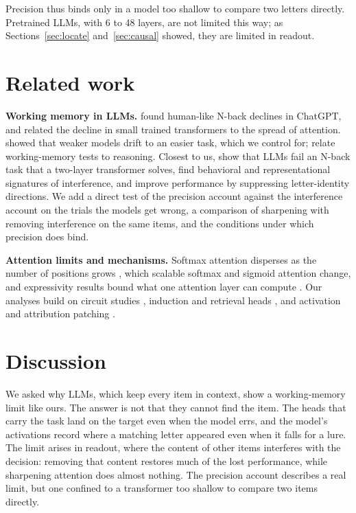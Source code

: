 \documentclass{article}
\begin{document}
Precision thus binds only in a model too shallow to compare two letters directly. Pretrained LLMs, with 6 to 48 layers, are not limited this way; as Sections~\ref{sec:locate} and~\ref{sec:causal} showed, they are limited in readout.



\section{Related work}
\label{sec:related}

\textbf{Working memory in LLMs.} \citet{gong2024chatgpt} found human-like N-back declines in ChatGPT, and \citet{gong2024selfattention} related the decline in small trained transformers to the spread of attention. \citet{hu2025nback} showed that weaker models drift to an easier task, which we control for; \citet{zhang2024wmreasoning} relate working-memory tests to reasoning. Closest to us, \citet{xiong2026superposition} show that LLMs fail an N-back task that a two-layer transformer solves, find behavioral and representational signatures of interference, and improve performance by suppressing letter-identity directions. We add a direct test of the precision account against the interference account on the trials the models get wrong, a comparison of sharpening with removing interference on the same items, and the conditions under which precision does bind.

\textbf{Attention limits and mechanisms.} Softmax attention disperses as the number of positions grows \citep{velickovic2025softmax,hayase2026critical}, which scalable softmax \citep{nakanishi2025scalable} and sigmoid attention \citep{ramapuram2024sigmoid} change, and expressivity results bound what one attention layer can compute \citep{hahn2020limitations,sanford2023representational}. Our analyses build on circuit studies \citep{elhage2021framework,wang2023ioi}, induction and retrieval heads \citep{olsson2022induction,wu2024retrieval}, and activation and attribution patching \citep{zhang2024patching,kramar2024atp}.

\section{Discussion}
\label{sec:discussion}

We asked why LLMs, which keep every item in context, show a working-memory limit like ours. The answer is not that they cannot find the item. The heads that carry the task land on the target even when the model errs, and the model's activations record where a matching letter appeared even when it falls for a lure. The limit arises in readout, where the content of other items interferes with the decision: removing that content restores much of the lost performance, while sharpening attention does almost nothing. The precision account describes a real limit, but one confined to a transformer too shallow to compare two items directly.
\end{document}
